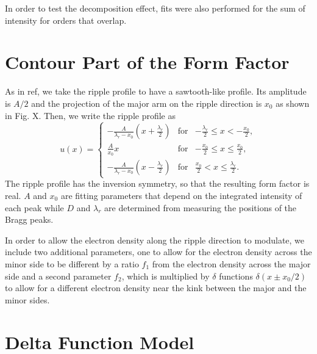 \documentclass[12pt,letterpaper]{article}
\begin{document}
In order to test the decomposition effect, fits were also performed
for the sum of intensity for orders that overlap. 


\section{Contour Part of the Form Factor}
As in ref, we take the ripple profile to have a sawtooth-like profile. Its
amplitude is  $A/2$ and the projection of the major arm on the 
ripple direction is $x_0$ as shown in Fig. X. Then, we write the ripple 
profile as
\begin{equation}
  u(x) = \left\{
    \begin{array}{ccc}
    -\frac{A}{\lambda_r-x_0}\left(x+\frac{\lambda_r}{2}\right) 
      & \text{for} 
      & -\frac{\lambda_r}{2} \leq x < -\frac{x_0}{2}, \\
    \frac{A}{x_0}x 
      & \text{for} 
      & -\frac{x_0}{2} \leq x \leq \frac{x_0}{2}, \\
    -\frac{A}{\lambda_r-x_0} \left(x-\frac{\lambda_r}{2}\right)
      & \text{for} 
      & \frac{x_0}{2} < x \leq \frac{\lambda_r}{2}.
    \end{array} \right.
\end{equation}
The ripple profile has the inversion symmetry, so that the resulting
form factor is real. $A$ and $x_0$ are fitting parameters that depend 
on the integrated intensity of each peak while $D$ and $\lambda_r$ are
determined from measuring the positions of the Bragg peaks.

In order to allow the electron density along the ripple direction to 
modulate, we include two additional parameters, one to allow for the electron
density across the minor side to be different by a ratio $f_1$ from the 
electron density across the major side and a second parameter $f_2$, which
is multiplied by $\delta$ functions $\delta(x \pm x_0/2)$ to allow for 
a different electron density near the kink between the major and the minor
sides. 


\section{Delta Function Model}
\end{document}
